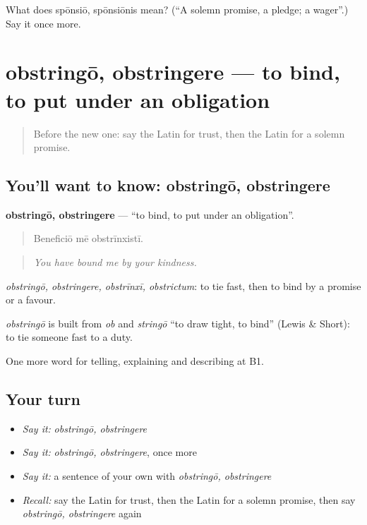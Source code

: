 \begin{tcolorbox}[breakable,colback=teal!4,colframe=teal!35!black,title={Before you move on}]
What does spōnsiō, spōnsiōnis mean? (\textquotedblleft{}A solemn promise, a pledge; a wager\textquotedblright{}.) Say it once more.
\end{tcolorbox}
\section[obstringō, obstringere]{obstringō, obstringere — to bind, to put under an obligation}

\label{lesson:LA-C396-obstringo}



\begin{quote}
Before the new one: say the Latin for trust, then the Latin for a solemn promise.
\end{quote}

\subsection*{You'll want to know: obstringō, obstringere}
\textbf{obstringō, obstringere} — \textquotedblleft{}to bind, to put under an obligation\textquotedblright{}.

\begin{quote}
Beneficiō mē obstrīnxistī.
\end{quote}

\begin{quote}
\emph{You have bound me by your kindness.}
\end{quote}

\emph{obstringō, obstringere, obstrīnxī, obstrictum}: to tie fast, then to bind by a promise or a favour.

\begin{cousinweb}
\emph{obstringō} is built from \emph{ob} and \emph{stringō} \textquotedblleft{}to draw tight, to bind\textquotedblright{} (Lewis \& Short): to tie someone fast to a duty.
\end{cousinweb}

\begin{grammarlens}[title={What you've built}]
One more word for telling, explaining and describing at B1.
\end{grammarlens}

\subsection*{Your turn}
\begin{itemize}
\raggedright
  \item \emph{Say it:} \emph{obstringō, obstringere}
  \item \emph{Say it:} \emph{obstringō, obstringere}, once more
  \item \emph{Say it:} a sentence of your own with \emph{obstringō, obstringere}
  \item \emph{Recall:} say the Latin for trust, then the Latin for a solemn promise, then say \emph{obstringō, obstringere} again
\end{itemize}

